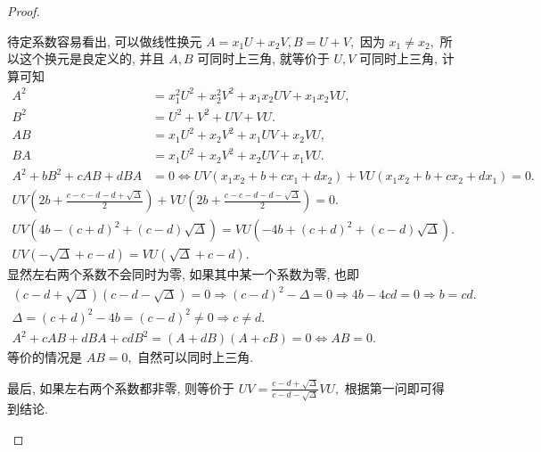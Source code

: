 \documentclass[../../main.tex]{subfiles}%
\begin{document}
\begin{proof}
\begin{enumerate}[(1)]
待定系数容易看出, 可以做线性换元 \(A = x_1U+x_2V, B=U+V,\) 因为 \(x_1 \ne x_2,\) 所以这个换元是良定义的, 并且 \(A, B\) 可同时上三角, 就等价于 \(U, V\) 可同时上三角, 计算可知
\begin{align*}
A^2 &= x_1^2U^2 + x_2^2V^2 + x_1x_2UV + x_1x_2VU, \\
B^2 &= U^2+V^2+UV+VU. \\
AB &= x_1U^2 + x_2V^2 + x_1UV + x_2VU, \\
BA &= x_1U^2 + x_2V^2 + x_2UV + x_1VU. \\
A^2 + bB^2 + cAB + dBA &= 0 \iff UV(x_1x_2+b+cx_1+dx_2) + VU(x_1x_2+b+cx_2+dx_1) = 0.
\end{align*}
\begin{gather*}
UV\left(2b + \frac{c-c-d-d+\sqrt{\Delta}}{2}\right) + VU\left(2b + \frac{c-c-d-d-\sqrt{\Delta}}{2}\right) = 0. \\
UV\left(4b - (c+d)^2 + (c-d)\sqrt{\Delta}\right) = VU\left(-4b + (c+d)^2 + (c-d)\sqrt{\Delta}\right). \\
UV\left(-\sqrt{\Delta} + c-d\right) = VU\left(\sqrt{\Delta} + c-d\right).
\end{gather*}
显然左右两个系数不会同时为零, 如果其中某一个系数为零, 也即
\begin{gather*}
(c-d+\sqrt{\Delta})(c-d-\sqrt{\Delta}) = 0 \Longrightarrow (c-d)^2 - \Delta = 0 \Longrightarrow 4b - 4cd = 0 \Longrightarrow b = cd. \\
\Delta = (c+d)^2 - 4b = (c-d)^2 \ne 0 \Longrightarrow c \ne d. \\
A^2 + cAB + dBA + cdB^2 = (A+dB)(A+cB) = 0 \iff AB=0.
\end{gather*}
等价的情况是 \(AB=0,\) 自然可以同时上三角.

最后, 如果左右两个系数都非零, 则等价于 \(UV = \frac{c-d+\sqrt{\Delta}}{c-d-\sqrt{\Delta}}VU,\) 根据第一问即可得到结论.
\end{enumerate}
\end{proof}
\end{document}
